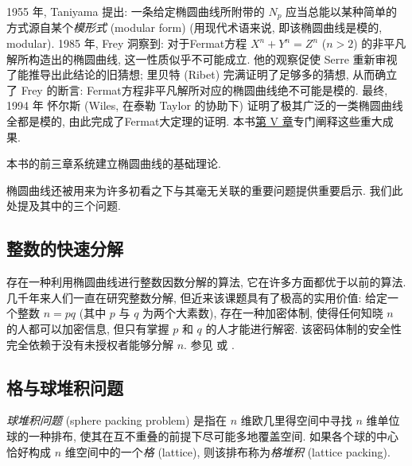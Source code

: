 1955 年, Taniyama 提出: 一条给定椭圆曲线所附带的 $N_p$ 应当总能以某种简单的方式源自某个\textit{模形式} (modular form) (用现代术语来说, 即该椭圆曲线是模的, modular). 1985 年, Frey 洞察到: 对于Fermat方程 $X^n + Y^n = Z^n$ ($n > 2$) 的非平凡解所构造出的椭圆曲线, 这一性质似乎不可能成立. 他的观察促使 Serre 重新审视了能推导出此结论的旧猜想; 里贝特 (Ribet) 完满证明了足够多的猜想, 从而确立了 Frey 的断言: Fermat方程非平凡解所对应的椭圆曲线绝不可能是模的. 最终, 1994 年 怀尔斯 (Wiles, 在泰勒 Taylor 的协助下) 证明了极其广泛的一类椭圆曲线全都是模的, 由此完成了Fermat大定理的证明. 本书\hyperref[ch:5]{第 V 章}专门阐释这些重大成果.

本书的前三章系统建立椭圆曲线的基础理论.

椭圆曲线还被用来为许多初看之下与其毫无关联的重要问题提供重要启示. 我们此处提及其中的三个问题.

\subsection*{整数的快速分解}
存在一种利用椭圆曲线进行整数因数分解的算法, 它在许多方面都优于以前的算法. 几千年来人们一直在研究整数分解, 但近来该课题具有了极高的实用价值: 给定一个整数 $n = pq$ (其中 $p$ 与 $q$ 为两个大素数), 存在一种加密体制, 使得任何知晓 $n$ 的人都可以加密信息, 但只有掌握 $p$ 和 $q$ 的人才能进行解密. 该密码体制的安全性完全依赖于没有未授权者能够分解 $n$. 参见 \cite[VI, 4]{koblitz1994} 或 \cite[IV, 4]{silvermantate1992}.

\subsection*{格与球堆积问题}
\textit{球堆积问题} (sphere packing problem) 是指在 $n$ 维欧几里得空间中寻找 $n$ 维单位球的一种排布, 使其在互不重叠的前提下尽可能多地覆盖空间. 如果各个球的中心恰好构成 $n$ 维空间中的一个\textit{格} (lattice), 则该排布称为\textit{格堆积} (lattice packing).

